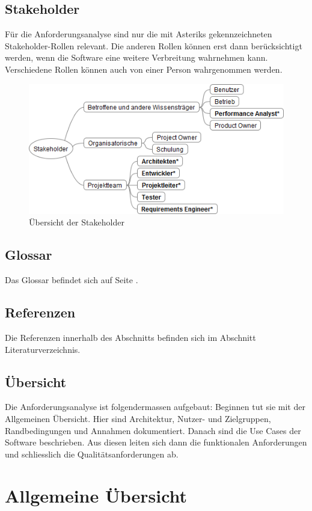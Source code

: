 \subsection{Stakeholder}
Für die Anforderungsanalyse sind nur die mit Asteriks gekennzeichneten Stakeholder-Rollen relevant. Die anderen Rollen können erst dann berücksichtigt werden, wenn die Software eine weitere Verbreitung wahrnehmen kann. Verschiedene Rollen können auch von einer Person wahrgenommen werden. 
\begin{figure}[H]
  	\centering
    	\includegraphics[width=13cm]{images/stakeholder_analyse}
        	\caption{Übersicht der Stakeholder}
\end{figure}

\subsection{Glossar}
Das Glossar befindet sich auf Seite \pageref{glossar}. 
\subsection{Referenzen}
Die Referenzen innerhalb des Abschnitts  befinden sich im Abschnitt Literaturverzeichnis.
\subsection{Übersicht}
Die Anforderungsanalyse ist folgendermassen aufgebaut: Beginnen tut sie mit der Allgemeinen Übersicht. Hier sind Architektur, Nutzer- und Zielgruppen, Randbedingungen und Annahmen dokumentiert. Danach sind die Use Cases der Software beschrieben. Aus diesen leiten sich dann die funktionalen Anforderungen und schliesslich die Qualitätsanforderungen ab.
\section{Allgemeine Übersicht}\label{allgemeine_uebersicht}
